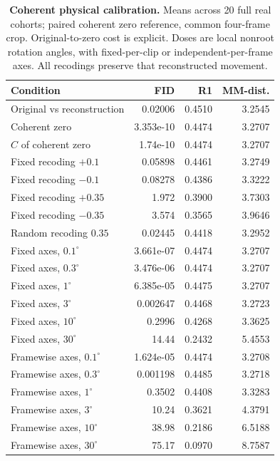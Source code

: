 \begin{table}[t]
\centering\footnotesize
\caption{\textbf{Coherent physical calibration.} Means across 20 full real cohorts; paired coherent zero reference, common four-frame crop. Original-to-zero cost is explicit. Doses are local nonroot rotation angles, with fixed-per-clip or independent-per-frame axes. All recodings preserve that reconstructed movement.}\label{tab:physicalcal}
\begin{tabular}{@{}lrrr@{}}\toprule
Condition&FID&R1&MM-dist.\\\midrule
Original vs reconstruction&0.02006&0.4510&3.2545\\
Coherent zero&3.353e-10&0.4474&3.2707\\
$C$ of coherent zero&1.74e-10&0.4474&3.2707\\
Fixed recoding $+0.1$&0.05898&0.4461&3.2749\\
Fixed recoding $-0.1$&0.08278&0.4386&3.3222\\
Fixed recoding $+0.35$&1.972&0.3900&3.7303\\
Fixed recoding $-0.35$&3.574&0.3565&3.9646\\
Random recoding $0.35$&0.02445&0.4418&3.2952\\
Fixed axes, $0.1^\circ$&3.661e-07&0.4474&3.2707\\
Fixed axes, $0.3^\circ$&3.476e-06&0.4474&3.2707\\
Fixed axes, $1^\circ$&6.385e-05&0.4475&3.2707\\
Fixed axes, $3^\circ$&0.002647&0.4468&3.2723\\
Fixed axes, $10^\circ$&0.2996&0.4268&3.3625\\
Fixed axes, $30^\circ$&14.44&0.2432&5.4553\\
Framewise axes, $0.1^\circ$&1.624e-05&0.4474&3.2708\\
Framewise axes, $0.3^\circ$&0.001198&0.4485&3.2718\\
Framewise axes, $1^\circ$&0.3502&0.4408&3.3283\\
Framewise axes, $3^\circ$&10.24&0.3621&4.3791\\
Framewise axes, $10^\circ$&38.98&0.2186&6.5188\\
Framewise axes, $30^\circ$&75.17&0.0970&8.7587\\
\bottomrule\end{tabular}\end{table}
